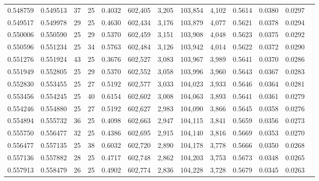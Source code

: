 \begin{tabular}{rrrrrrrrrrrrr}
0.548759 & 0.549513 &    37 &  25 &                                     0.4032 & 602,405 &   3,205 & 103,854 &   4,102 & 0.5614 & 0.0380 & 0.0297 \\
0.549517 & 0.549978 &    29 &  25 &                                     0.4630 & 602,434 &   3,176 & 103,879 &   4,077 & 0.5621 & 0.0378 & 0.0294 \\
0.550006 & 0.550590 &    25 &  29 &                                     0.5370 & 602,459 &   3,151 & 103,908 &   4,048 & 0.5623 & 0.0375 & 0.0292 \\
0.550596 & 0.551234 &    25 &  34 &                                     0.5763 & 602,484 &   3,126 & 103,942 &   4,014 & 0.5622 & 0.0372 & 0.0290 \\
0.551276 & 0.551924 &    43 &  25 &                                     0.3676 & 602,527 &   3,083 & 103,967 &   3,989 & 0.5641 & 0.0370 & 0.0286 \\
0.551949 & 0.552805 &    25 &  29 &                                     0.5370 & 602,552 &   3,058 & 103,996 &   3,960 & 0.5643 & 0.0367 & 0.0283 \\
0.552830 & 0.553455 &    25 &  27 &                                     0.5192 & 602,577 &   3,033 & 104,023 &   3,933 & 0.5646 & 0.0364 & 0.0281 \\
0.553456 & 0.554245 &    25 &  40 &                                     0.6154 & 602,602 &   3,008 & 104,063 &   3,893 & 0.5641 & 0.0361 & 0.0279 \\
0.554246 & 0.554880 &    25 &  27 &                                     0.5192 & 602,627 &   2,983 & 104,090 &   3,866 & 0.5645 & 0.0358 & 0.0276 \\
0.554894 & 0.555732 &    36 &  25 &                                     0.4098 & 602,663 &   2,947 & 104,115 &   3,841 & 0.5659 & 0.0356 & 0.0273 \\
0.555750 & 0.556477 &    32 &  25 &                                     0.4386 & 602,695 &   2,915 & 104,140 &   3,816 & 0.5669 & 0.0353 & 0.0270 \\
0.556477 & 0.557135 &    25 &  38 &                                     0.6032 & 602,720 &   2,890 & 104,178 &   3,778 & 0.5666 & 0.0350 & 0.0268 \\
0.557136 & 0.557882 &    28 &  25 &                                     0.4717 & 602,748 &   2,862 & 104,203 &   3,753 & 0.5673 & 0.0348 & 0.0265 \\
0.557913 & 0.558479 &    26 &  25 &                                     0.4902 & 602,774 &   2,836 & 104,228 &   3,728 & 0.5679 & 0.0345 & 0.0263 \\

\end{tabular}
